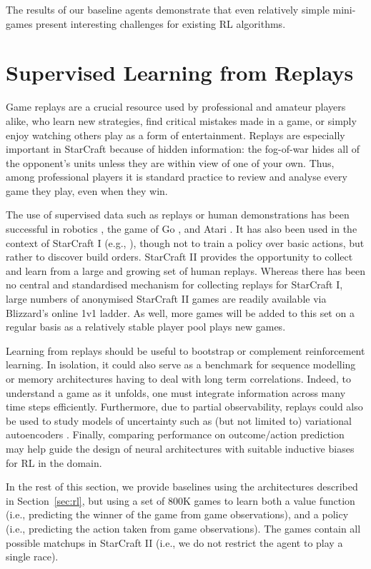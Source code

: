 \documentclass{article}
\begin{document}
The results of our baseline agents demonstrate that even relatively simple mini-games present interesting challenges for existing RL algorithms. \section{Supervised Learning from Replays}\label{sec:sl}

Game replays are a crucial resource used by professional and amateur players alike, who learn new strategies, find critical mistakes made in a game, or simply enjoy watching others play as a form of entertainment. Replays are especially important in StarCraft because of hidden information:  the fog-of-war hides all of the opponent's units unless they are within view of one of your own. Thus, among professional players it is standard practice to review and analyse every game they play, even when they win. 

The use of supervised data such as replays or human demonstrations has been successful in robotics \cite{argall2009survey,popov2017data}, the game of Go \cite{maddison2014move,silver2016mastering}, and Atari \cite{hester2017learning}. It has also been used in the context of StarCraft I (e.g., \cite{justesen2017learning}), though not to train a policy over basic actions, but rather to discover build orders. StarCraft II provides the opportunity to collect and learn from a large and growing set of human replays. Whereas there has been no central and standardised mechanism for collecting replays for StarCraft I, large numbers of anonymised StarCraft II games are readily available via Blizzard's online 1v1 ladder.  As well, more games will be added to this set on a regular basis as a relatively stable player pool plays new games.

Learning from replays should be useful to bootstrap or complement reinforcement learning.  In isolation, it could also serve as a benchmark for sequence modelling or memory architectures having to deal with long term correlations. Indeed, to understand a game as it unfolds, one must integrate information across many time steps efficiently. Furthermore, due to partial observability, replays could also be used to study models of uncertainty such as (but not limited to) variational autoencoders \cite{Kingma:2014}. Finally, comparing performance on outcome/action prediction may help guide the design of neural architectures with suitable inductive biases for RL in the domain.

In the rest of this section, we provide baselines using the architectures described in Section~\ref{sec:rl}, but using a set of 800K games to learn both a value function (i.e., predicting the winner of the game from game observations), and a policy (i.e., predicting the action taken from game observations). The games contain all possible matchups in StarCraft II (i.e., we do not restrict the agent to play a single race). 
\end{document}
